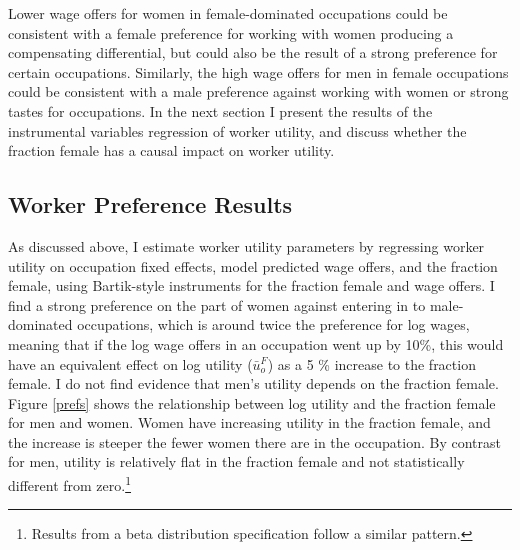 \documentclass[12pt]{article}
\begin{document}
Lower wage offers for women in female-dominated occupations could be consistent with a female preference for working with women producing a compensating differential, but could also be the result of a strong preference for certain occupations. Similarly, the high wage offers for men in female occupations could be consistent with a male preference against working with women or strong tastes for occupations. In the next section I present the results of the instrumental variables regression of worker utility, and discuss whether the fraction female has a causal impact on worker utility.















\subsection{Worker Preference Results}
As discussed above, I estimate worker utility parameters by regressing worker utility on occupation fixed effects, model predicted wage offers, and the fraction female, using Bartik-style instruments for the fraction female and wage offers. I find a strong preference on the part of women against entering in to male-dominated occupations, which is around twice the preference for log wages, meaning that if the log wage offers in an occupation went up by 10\%, this would have an equivalent effect on log utility ($\bar{u}^F_o$) as a 5 \% increase to the fraction female. I do not find evidence that men's utility depends on the fraction female. Figure \ref{prefs} shows the relationship between log utility and the fraction female for men and women. Women have increasing utility in the fraction female, and the increase is steeper the fewer women there are in the occupation. By contrast for men, utility is relatively flat in the fraction female and not statistically different from zero.\footnote{Results from a beta distribution specification follow a similar pattern.}
\end{document}
